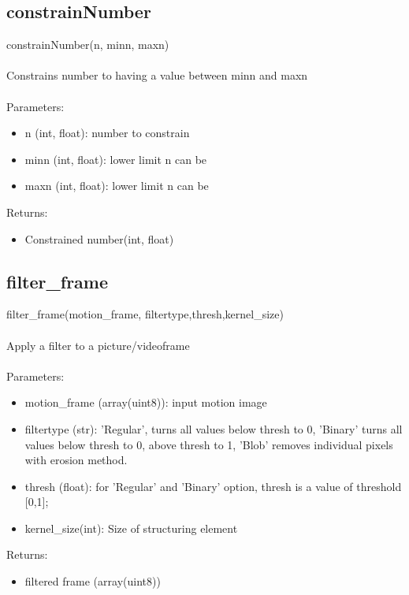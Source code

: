 \documentclass[9pt]{extarticle}
\begin{document}
\subsection{constrainNumber}
    constrainNumber(n, minn, maxn)\\\\
    Constrains number to having a value between minn and maxn
    \\\\
    Parameters:
    \begin{itemize}
    \item [] n (int, float): number to constrain
    \item [] minn (int, float): lower limit n can be
    \item [] maxn (int, float): lower limit n can be
    \end{itemize}
    Returns:
    \begin{itemize}
    \item [] Constrained number(int, float)
\end{itemize}

\subsection{filter\_frame}
    filter\_frame(motion\_frame, filtertype,thresh,kernel\_size)
    \\\\
    Apply a filter to a picture/videoframe
    \\\\
    Parameters:
    \begin{itemize}
    \item [] motion\_frame (array(uint8)): input motion image
    \item [] filtertype (str): ’Regular’, turns all values below thresh to 0, ’Binary’ turns all values below thresh to 0, above thresh to 1, ’Blob’ removes individual pixels with erosion method.
    \item [] thresh (float): for ’Regular’ and ’Binary’ option, thresh is a value of threshold [0,1];
    \item [] kernel\_size(int): Size of structuring element
    \end{itemize}
    Returns: 
    \begin{itemize}
    \item [] filtered frame (array(uint8))
    \end{itemize}
\end{document}
